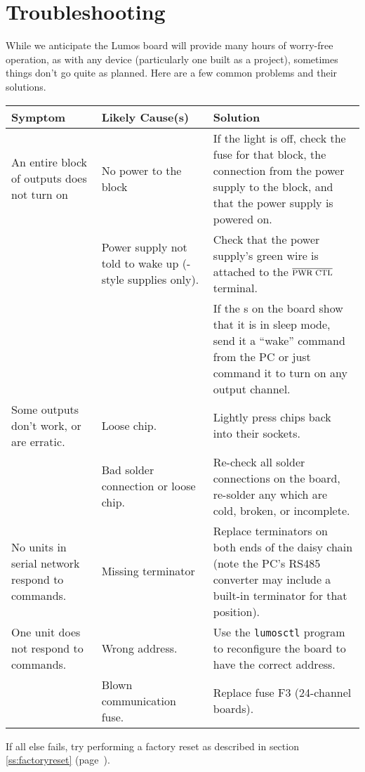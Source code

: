 \documentclass[letterpaper,twoside,onecolumn,openright,final]{memoir}
\begin{document}
\chapter{Troubleshooting}
While we anticipate the Lumos board will provide many hours of worry-free operation,
as with any device (particularly one built as a  project), sometimes things don't go
quite as planned.  Here are a few common problems and their solutions.

\begin{longtable}{|p{1.5in}|p{1.5in}|p{2in}|}\hline
\bfseries Symptom & \bfseries Likely Cause(s) & \bfseries Solution \\\hline\hline
\endhead
An entire block of outputs does not turn on 
	& No power to the block 
	& If the \mc{BLOCK PWR} light is off, check the fuse for that block, 
	  the connection from the power supply to the block, and that the power supply is powered on.\\
\cline{2-3}
	& Power supply not told to wake up (\mc{ATX}-style supplies only).
	& Check that the power supply's green wire is attached to the $\overline{\hbox{\mc{PWR CTL}}}$
	  terminal. \\
\cline{3-3}
	&& If the \acronym{LED}s on the board show that it is in sleep mode,  send it a ``wake'' command
	from the PC or just command it to turn on any output channel.
\\\hline
Some outputs don't work, or are erratic.
	& Loose %
chip.
	& Lightly press chips back into their sockets.\\
\cline{2-3}
	& Bad solder connection or loose chip.
	& Re-check all solder connections on the board, re-solder any which are cold, broken, or
	  incomplete.\\\hline
No units in serial network respond to commands.
	& Missing terminator
	& Replace terminators on both ends of the daisy chain (note the PC's RS485 converter
	  may include a built-in terminator for that position).\\\hline
One unit does not respond to commands.
	& Wrong address.
	& Use the \verb+lumosctl+ program to reconfigure the board to have
	  the correct address.\\
\cline{2-3}
	& Blown communication fuse.
	& Replace fuse F3 (24-channel boards).\\\hline
\end{longtable}

If all else fails, try performing a factory reset as described in section \ref{ss:factoryreset} (page~\pageref{ss:factoryreset}).
\end{document}
